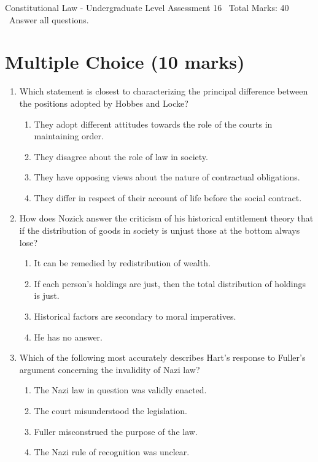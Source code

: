 \documentclass[12pt]{article}
\begin{document}
\begin{center}
Constitutional Law - Undergraduate Level Assessment 16 \
Total Marks: 40 \
Answer all questions.
\end{center}

\section*{Multiple Choice (10 marks)}
\begin{enumerate}[label=\arabic*.]
\item Which statement is closest to characterizing the principal difference between the positions adopted by Hobbes and Locke?
\begin{enumerate}[label=(\alph*)]
    \item They adopt different attitudes towards the role of the courts in maintaining order.
    \item They disagree about the role of law in society.
    \item They have opposing views about the nature of contractual obligations.
    \item They differ in respect of their account of life before the social contract.
\end{enumerate}
\item How does Nozick answer the criticism of his historical entitlement theory that if the distribution of goods in society is unjust those at the bottom always lose?
\begin{enumerate}[label=(\alph*)]
    \item It can be remedied by redistribution of wealth.
    \item If each person's holdings are just, then the total distribution of holdings is just.
    \item Historical factors are secondary to moral imperatives.
    \item He has no answer.
\end{enumerate}
\item Which of the following most accurately describes Hart's response to Fuller's argument concerning the invalidity of Nazi law?
\begin{enumerate}[label=(\alph*)]
    \item The Nazi law in question was validly enacted.
    \item The court misunderstood the legislation.
    \item Fuller misconstrued the purpose of the law.
    \item The Nazi rule of recognition was unclear.

\end{enumerate}
\end{enumerate}
\end{document}
